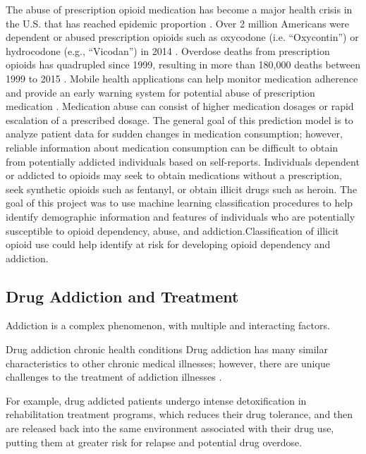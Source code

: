\documentclass[sigconf]{acmart}
\begin{document}
The abuse of prescription opioid medication has become a major health crisis 
in the U.S. that has reached epidemic proportion \cite{volkow14}. Over 2 
million Americans were dependent or abused prescription opioids such as 
oxycodone (i.e. ``Oxycontin'') or hydrocodone (e.g., ``Vicodan'') in 2014 
\cite{cdc17}. Overdose deaths from prescription opioids has quadrupled since 
1999, resulting in more than 180,000 deaths between 1999 to 2015 \cite{nida17}. 
Mobile health applications can help monitor medication adherence and provide 
an early warning system for potential abuse of prescription medication 
\cite{varshney13}. Medication abuse can consist of higher medication dosages 
or rapid escalation of a prescribed dosage. The general goal of this prediction 
model is to analyze patient data for sudden changes in medication consumption;
however, reliable information about medication consumption can be difficult 
to obtain from potentially addicted individuals based on self-reports. 
Individuals dependent or addicted to opioids may seek to obtain medications 
without a prescription, seek synthetic opioids such as fentanyl, or obtain 
illicit drugs such as heroin. The goal of this project was to use machine
learning classification procedures to help identify demographic information 
and features of individuals who are potentially susceptible to opioid 
dependency, abuse, and addiction.Classification of illicit opioid use
could help identify at risk for developing opioid dependency and addiction. 

\subsection{Drug Addiction and Treatment}









Addiction is a complex phenomenon, with multiple and interacting factors. 


Drug addiction chronic health conditions 
Drug addiction has many similar characteristics to other chronic medical 
illnesses; however, there are unique challenges to the treatment of addiction
illnesses \cite{boyer10}. 

For example, drug addicted patients undergo intense detoxification 
in rehabilitation treatment programs, which reduces their drug tolerance, and 
then are released back into the same environment associated with their drug use, 
putting them at greater risk for relapse and potential drug overdose. 
\end{document}
